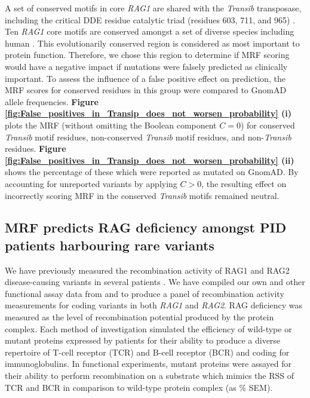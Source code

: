 \documentclass[preprint,11pt,fleqn]{elsarticle}
\begin{document}
A set of conserved motifs in core \textit{RAG1} are shared with the \textit{Transib} transposase, including the critical DDE residue catalytic triad (residues 603, 711, and 965) 
\citep{kapitonov2005rag1}. 
Ten \textit{RAG1} core  motifs are conserved amongst a set of diverse species including human \citep{kapitonov2005rag1}. 
This evolutionarily conserved region is considered as most important to protein function.
Therefore, we chose this region to determine if MRF scoring would have a negative impact if mutations were falsely predicted as clinically important.
To assess the influence of a false positive effect on prediction, the MRF scores for conserved residues in this group were compared to GnomAD allele frequencies.
\textbf{Figure \ref{fig:False_positives_in_Transip_does_not_worsen_probability} (i)} 
plots the MRF (without omitting the Boolean component $C=0$) for conserved \textit{Transib} motif residues, non-conserved \textit{Transib} motif residues, and non-\textit{Transib} residues. 
\textbf{Figure \ref{fig:False_positives_in_Transip_does_not_worsen_probability} (ii)}
shows the percentage of these which were reported as mutated on GnomAD. 
By accounting for unreported variants by applying $C>0$, the resulting effect on incorrectly scoring MRF in the conserved \textit{Transib} motifs remained neutral. 

\subsection*{\textbf{MRF predicts RAG deficiency amongst PID patients harbouring rare variants}}
\noindent 
We have previously measured the recombination activity of RAG1 and RAG2 disease-causing variants in several patients \citep{lawless2018prevalence}. 
We have compiled our own and other functional assay data from \citet{lee2014systematic} and 
\citet{tirosh2018recombination} to produce a panel of recombination activity  measurements for coding variants in both \textit{RAG1} and \textit{RAG2}. 
RAG deficiency was measured as the level of recombination potential produced by the protein complex. 
Each method of investigation simulated the efficiency of wild-type or mutant proteins expressed by patients for their ability to produce a diverse repertoire of T-cell receptor (TCR) and B-cell receptor (BCR) and coding for immunoglobulins. 
In functional experiments, mutant proteins were assayed for their ability to perform recombination on a substrate which mimics the RSS of TCR and BCR in comparison to wild-type protein complex (as \% SEM). 
\end{document}
